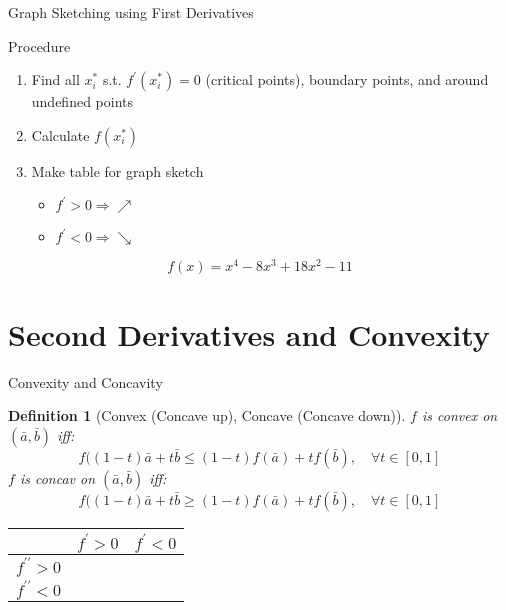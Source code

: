 \documentclass[final]{beamer}
\newtheorem{defn}{Definition}
\begin{document}
\begin{frame}[t]{Graph Sketching using First Derivatives}
	\begin{block}{Procedure}
		\begin{enumerate}[(STEP 1)]
			\item Find all $x_i^\ast$ s.t. $f^\prime (x_i^\ast)=0$ (critical points), boundary points, and around undefined points
			\item Calculate $f(x_i^\ast)$
			\item Make table for graph sketch
			\begin{itemize}
				\item $f^\prime >0 \Rightarrow \nearrow$
				\item $f^\prime <0 \Rightarrow \searrow$
			\end{itemize}
		\end{enumerate}
	\end{block}
	\[
		f(x) = x^4 -8x^3 + 18x^2 - 11 \tag{Ex3.1}
	\]
\end{frame}


\section{Second Derivatives and Convexity} %
\label{sec:second_derivatives}

\begin{frame}[t]{Convexity and Concavity}
	\begin{defn}
		[Convex (Concave up), Concave (Concave down)]
		$f$ is convex on $(\bar a, \bar b)$ iff:
		\[
			f((1-t)\bar a + t \bar b \le (1-t)f(\bar a)+ tf(\bar b),\quad \forall t\in [0,1]
		\]
		$f$ is concav on $(\bar a, \bar b)$ iff:
		\[
			f((1-t)\bar a + t \bar b \ge (1-t)f(\bar a)+ tf(\bar b),\quad \forall t\in [0,1]
		\]
	\end{defn}
	\begin{center}
		\begin{tabular}{c|c|c}
		&	$f^\prime >0 $& $f^\prime<0$	\\
		\hline\hline
		$f^{\prime\prime}>0$&	&\\
		\hline
		$f^{\prime\prime}<0$&&\\
		\end{tabular}
	\end{center}
\end{frame}
\end{document}
